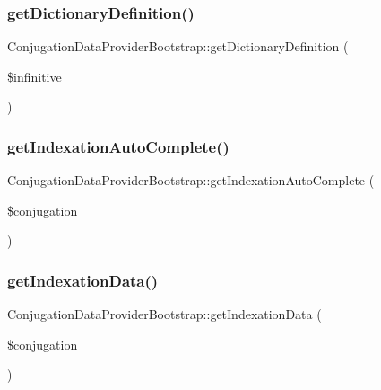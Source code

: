 \hypertarget{class_conjugation_data_provider_bootstrap_a6e00cefec5c7a7821f039a263ddbe21a}{}\label{class_conjugation_data_provider_bootstrap_a6e00cefec5c7a7821f039a263ddbe21a} 
\subsubsection{\texorpdfstring{get\+Dictionary\+Definition()}{getDictionaryDefinition()}}
{\footnotesize\ttfamily Conjugation\+Data\+Provider\+Bootstrap\+::get\+Dictionary\+Definition (\begin{DoxyParamCaption}\item[{}]{\$infinitive }\end{DoxyParamCaption})}

\hypertarget{class_conjugation_data_provider_bootstrap_a5a98878c2e74fe7d3e9c53bff4250922}{}\label{class_conjugation_data_provider_bootstrap_a5a98878c2e74fe7d3e9c53bff4250922} 
\subsubsection{\texorpdfstring{get\+Indexation\+Auto\+Complete()}{getIndexationAutoComplete()}}
{\footnotesize\ttfamily Conjugation\+Data\+Provider\+Bootstrap\+::get\+Indexation\+Auto\+Complete (\begin{DoxyParamCaption}\item[{}]{\$conjugation }\end{DoxyParamCaption})}

\hypertarget{class_conjugation_data_provider_bootstrap_a2e41e1de20ebc690c39f91fb05442450}{}\label{class_conjugation_data_provider_bootstrap_a2e41e1de20ebc690c39f91fb05442450} 
\subsubsection{\texorpdfstring{get\+Indexation\+Data()}{getIndexationData()}}
{\footnotesize\ttfamily Conjugation\+Data\+Provider\+Bootstrap\+::get\+Indexation\+Data (\begin{DoxyParamCaption}\item[{}]{\$conjugation }\end{DoxyParamCaption})}

